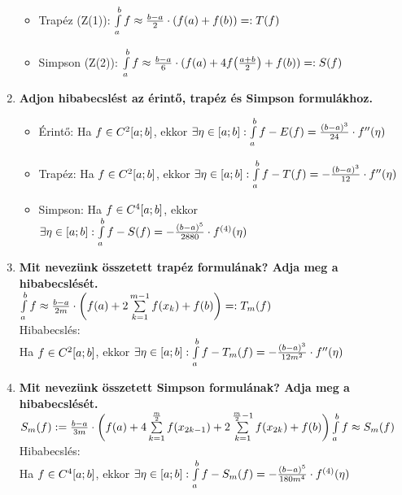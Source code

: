 \documentclass{article}
\begin{document}
\begin{enumerate}
\begin{itemize}
		\item Trapéz (Z(1)): $\int\limits_{a}^{b} f\approx\frac{b-a}{2}\cdot(f(a)+f(b))=:T(f)$
		\item Simpson (Z(2)): $\int\limits_{a}^{b} f\approx\frac{b-a}{6}\cdot(f(a)+4f\big(
		\frac{a+b}{2}\big)+f(b))=:S(f)$
	\end{itemize}
	\item\textbf{Adjon hibabecslést az érintő, trapéz és Simpson formulákhoz.}
	\begin{itemize}
		\item Érintő: Ha $f\in C^2[a;b]$, ekkor $\exists\eta\in[a;b]:\int\limits_{a}^{b} f-E(f)=
		\frac{(b-a)^3}{24}\cdot f''(\eta)$
		\item Trapéz: Ha $f\in C^2[a;b]$, ekkor $\exists\eta\in[a;b]:\int\limits_{a}^{b} f-T(f)=
		-\frac{(b-a)^3}{12}\cdot f''(\eta)$
		\item Simpson: Ha $f\in C^4[a;b]$, ekkor $\exists\eta\in[a;b]:\int\limits_{a}^{b} f-S(f)=
		-\frac{(b-a)^5}{2880}\cdot f^{(4)}(\eta)$
	\end{itemize}
	\item\textbf{Mit nevezünk összetett trapéz formulának? Adja meg a hibabecslését.}\\[0.1cm]
	$\int\limits_{a}^{b} f\approx\frac{b-a}{2m}\cdot\bigg(f(a)+2\sum\limits_{k=1}^{m-1}
	f(x_k)+f(b)\bigg)=:T_m(f)$\\[0.3cm]Hibabecslés:\\[0.1cm]
	{\Large Ha $f\in C^2[a;b]$, ekkor $\exists\eta\in[a;b]:\int\limits_{a}^{b} f-T_m(f)=-\frac{(b-a)^3}{12m^2}\cdot f''(\eta)$}
	\newpage
	\item\textbf{Mit nevezünk összetett Simpson formulának? Adja meg a hibabecslését.}\\[0.1cm]
	$S_m(f):=\frac{b-a}{3m}\cdot\bigg(f(a)+4\sum\limits_{k=1}^{\frac{m}{2}}
	f(x_{2k-1})+2\sum\limits_{k=1}^{\frac{m}{2}-1}f(x_{2k})+f(b)\bigg)\\[0.1cm]
	\int\limits_{a}^{b} f\approx S_m(f)$\\[0.3cm]Hibabecslés:\\[0.1cm]
	{\Large Ha $f\in C^4[a;b]$, ekkor $\exists\eta\in[a;b]:\int\limits_{a}^{b} f-S_m(f)=
	-\frac{(b-a)^5}{180m^4}\cdot f^{(4)}(\eta)$}
\end{enumerate}
\end{document}
